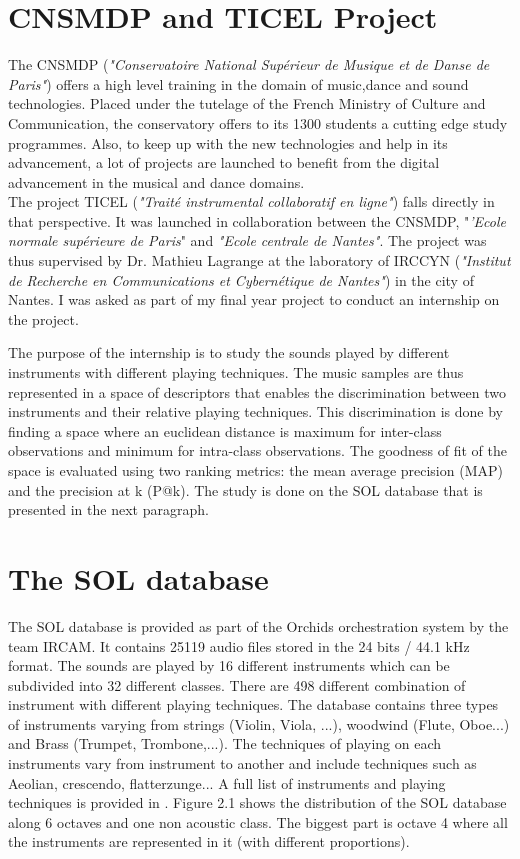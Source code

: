 \documentclass[hidelinks,12pt]{report}
\begin{document}
\section{CNSMDP and TICEL Project}
The CNSMDP  (\textit{"Conservatoire National Supérieur de Musique et de Danse de Paris"}) offers a high level training in the domain of music,dance and sound technologies. Placed under the tutelage of the French Ministry of Culture and Communication, the conservatory offers to its 1300 students a cutting edge study programmes. Also, to keep up with the new technologies and help in its advancement, a lot of projects are launched to benefit from the digital advancement in the musical and dance domains. \\
The project TICEL (\textit{"Traité instrumental collaboratif en ligne"}) falls directly in that perspective. It was launched in collaboration between the CNSMDP, "\textit{'Ecole normale supérieure de Paris}" and \textit{"Ecole centrale de Nantes"}. The project was thus supervised by Dr. Mathieu Lagrange at the laboratory of IRCCYN (\textit{"Institut de Recherche en Communications et Cybernétique de Nantes"}) in the city of Nantes. I was asked as part of my final year project to conduct an internship on the project. \par
The purpose of the internship is to study the sounds played by different instruments with different playing techniques. The music samples are thus represented in a space of descriptors that enables the  discrimination between two instruments and their relative playing techniques. This discrimination is done by finding a space where an euclidean distance is maximum for inter-class observations and minimum for intra-class observations. The goodness of fit of the space is evaluated using two ranking metrics: the mean average precision (MAP) and the precision at k (P@k). The study is done on the SOL database that is presented in the next paragraph.  \\ 

\section{The SOL database}
The SOL database is provided as part of the Orchids orchestration system by the team IRCAM. It contains 25119 audio files stored in the 24 bits / 44.1 kHz format. The sounds are played by 16 different instruments which can be subdivided into 32 different classes. There are 498 different combination of instrument with different playing techniques. The database contains three types of instruments varying from strings (Violin, Viola, ...), woodwind (Flute, Oboe...) and Brass (Trumpet, Trombone,...). The techniques of playing on each instruments vary from instrument to another and include techniques such as Aeolian, crescendo, flatterzunge... A full list of instruments and playing techniques is provided in \cite{SOL}.
Figure 2.1 shows the distribution of the SOL database along 6 octaves and one non acoustic class. The biggest part is octave 4 where all the instruments are represented in it (with different proportions).
\end{document}
